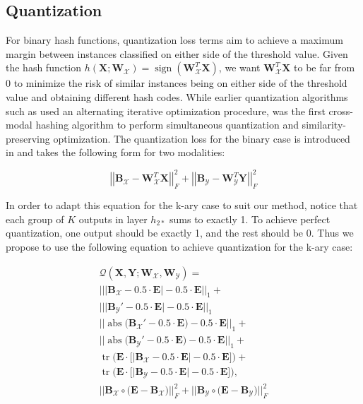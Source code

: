 \documentclass[letterpaper]{article}
\DeclareMathOperator{\sign}{sign}
\DeclareMathOperator{\trace}{tr}
\DeclareMathOperator{\abs}{abs}
\newcommand{\bpx}{\mathbf{B_\mathcal{X}}}
\newcommand{\bpy}{\mathbf{B_\mathcal{Y}}}
\newcommand{\WX}{\mathbf{W}_\mathcal{X}}
\newcommand{\WY}{\mathbf{W}_\mathcal{Y}}
\newcommand{\X}{\mathbf{X}}
\newcommand{\Y}{\mathbf{Y}}
\begin{document}
\subsection{Quantization}

For binary hash functions, quantization loss terms aim to achieve a maximum margin between instances classified on either side of the threshold value. Given the hash function $ h(\X; \WX) = \sign(\WX^T\X) $, we want $ \WX^T\X $ to be far from 0 to minimize the risk of similar instances being on either side of the threshold value and obtaining different hash codes. While earlier quantization algorithms such as \cite{itq,acq} used an alternating iterative optimization procedure, \cite{qch} was the first cross-modal hashing algorithm to perform simultaneous quantization and similarity-preserving optimization. The quantization loss for the binary case is introduced in \cite{itq} and takes the following form for two modalities:

\begin{equation}
\label{eq:binaryQuant}
\left|\left| \mathbf{B}_\mathcal{X} - \WX^T\X \right|\right|^2_F + \left|\left| \mathbf{B}_\mathcal{Y} - \WY^T\Y \right|\right|^2_F
\end{equation}

In order to adapt this equation for the k-ary case to suit our method, notice that each group of $ K $ outputs in layer $ h_{2*} $ sums to exactly 1. To achieve perfect quantization, one output should be exactly 1, and the rest should be 0. Thus we propose to use the following equation to achieve quantization for the k-ary case:

\begin{equation}
\label{eq:karyQuant}
\begin{gathered}
\mathcal{Q}(\X,\Y; \WX, \WY) = \\
\Big|\Big| \big| \bpx - 0.5 \cdot\mathbf{E}\big| - 0.5 \cdot \mathbf{E} \Big|\Big|_1 + \\
\Big|\Big| \big| \bpy' - 0.5 \cdot\mathbf{E}\big| - 0.5 \cdot \mathbf{E} \Big|\Big|_1 \\
\Big|\Big| \abs\big( \bpx' - 0.5 \cdot\mathbf{E}\big) - 0.5 \cdot \mathbf{E} \Big|\Big|_1 + \\
\Big|\Big| \abs\big( \bpy' - 0.5 \cdot\mathbf{E}\big) - 0.5 \cdot \mathbf{E} \Big|\Big|_1 + \\
\trace\Big(\mathbf{E} \cdot \Big[ \big| \bpx - 0.5 \cdot\mathbf{E}\big| - 0.5 \cdot \mathbf{E} \Big] \Big) + \\
\trace\Big(\mathbf{E} \cdot \Big[ \big| \bpy - 0.5 \cdot\mathbf{E}\big| - 0.5 \cdot \mathbf{E} \Big] \Big), \\
\big|\big| \bpx \circ \big(\mathbf{E} - \bpx \big) \big|\big|_F^2 + \big|\big| \bpy \circ \big(\mathbf{E} - \bpy \big) \big|\big|_F^2
\end{gathered}
\end{equation}
\end{document}
